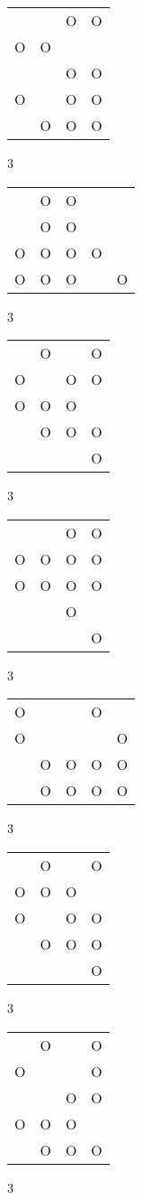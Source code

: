 \begin{tabular}{|m{0.2cm}m{0.2cm}m{0.2cm}m{0.2cm}|}\hline
 & &O&O\\
O&O& & \\
 & &O&O\\
O& &O&O\\
 &O&O&O\\
\hline\end{tabular}3
\begin{tabular}{|m{0.2cm}m{0.2cm}m{0.2cm}m{0.2cm}m{0.2cm}|}\hline
 &O&O& & \\
 &O&O& & \\
O&O&O&O& \\
O&O&O& &O\\
\hline\end{tabular}3
\begin{tabular}{|m{0.2cm}m{0.2cm}m{0.2cm}m{0.2cm}|}\hline
 &O& &O\\
O& &O&O\\
O&O&O& \\
 &O&O&O\\
 & & &O\\
\hline\end{tabular}3
\begin{tabular}{|m{0.2cm}m{0.2cm}m{0.2cm}m{0.2cm}|}\hline
 & &O&O\\
O&O&O&O\\
O&O&O&O\\
 & &O& \\
 & & &O\\
\hline\end{tabular}3
\begin{tabular}{|m{0.2cm}m{0.2cm}m{0.2cm}m{0.2cm}m{0.2cm}|}\hline
O& & &O& \\
O& & & &O\\
 &O&O&O&O\\
 &O&O&O&O\\
\hline\end{tabular}3
\begin{tabular}{|m{0.2cm}m{0.2cm}m{0.2cm}m{0.2cm}|}\hline
 &O& &O\\
O&O&O& \\
O& &O&O\\
 &O&O&O\\
 & & &O\\
\hline\end{tabular}3
\begin{tabular}{|m{0.2cm}m{0.2cm}m{0.2cm}m{0.2cm}|}\hline
 &O& &O\\
O& & &O\\
 & &O&O\\
O&O&O& \\
 &O&O&O\\
\hline\end{tabular}3
